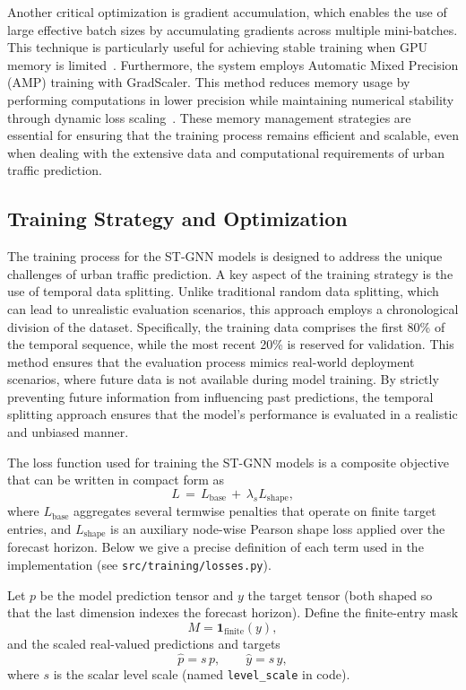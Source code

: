 \documentclass[11pt, a4paper]{article}
\begin{document}
Another critical optimization is gradient accumulation, which enables the use of large effective batch sizes by accumulating gradients across multiple mini-batches. This technique is particularly useful for achieving stable training when GPU memory is limited~\cite{ott2018scaling}. Furthermore, the system employs Automatic Mixed Precision (AMP) training with GradScaler. This method reduces memory usage by performing computations in lower precision while maintaining numerical stability through dynamic loss scaling~\cite{micikevicius2017mixed}. These memory management strategies are essential for ensuring that the training process remains efficient and scalable, even when dealing with the extensive data and computational requirements of urban traffic prediction.

\subsection{Training Strategy and Optimization}

The training process for the ST-GNN models is designed to address the unique challenges of urban traffic prediction. A key aspect of the training strategy is the use of temporal data splitting. Unlike traditional random data splitting, which can lead to unrealistic evaluation scenarios, this approach employs a chronological division of the dataset. Specifically, the training data comprises the first 80\% of the temporal sequence, while the most recent 20\% is reserved for validation. This method ensures that the evaluation process mimics real-world deployment scenarios, where future data is not available during model training. By strictly preventing future information from influencing past predictions, the temporal splitting approach ensures that the model's performance is evaluated in a realistic and unbiased manner.

The loss function used for training the ST-GNN models is a composite objective that can be written in compact form as
\begin{equation}
L \,=\, L_{\mathrm{base}} \, + \, \lambda_{s} L_{\mathrm{shape}},
\end{equation}
where $L_{\mathrm{base}}$ aggregates several termwise penalties that operate on finite target entries, and $L_{\mathrm{shape}}$ is an auxiliary node-wise Pearson shape loss applied over the forecast horizon. Below we give a precise definition of each term used in the implementation (see \texttt{src/training/losses.py}).

Let $p$ be the model prediction tensor and $y$ the target tensor (both shaped so that the last dimension indexes the forecast horizon). Define the finite-entry mask
\begin{equation}
M = \mathbf{1}_{\mathrm{finite}}(y),
\end{equation}
and the scaled real-valued predictions and targets
\begin{equation}
\hat p = s\,p, \qquad \hat y = s\,y,
\end{equation}
where $s$ is the scalar level scale (named \texttt{level\_scale} in code).
\end{document}

